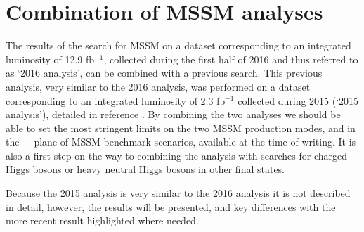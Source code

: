\chapter{Combination of MSSM analyses}
\label{sec:mssm_combination}
The results of the search for MSSM \AHtotautau on a dataset
corresponding to an integrated luminosity of 12.9 fb$^{-1}$, collected during the
first half of 2016 and thus referred to as `2016 analysis', can be combined 
with a previous search. This previous analysis, very similar to the 2016 analysis,
was performed on a dataset corresponding to an integrated luminosity of 2.3 fb$^{-1}$
collected during 2015 (`2015 analysis'), detailed in reference \cite{CMS-PAS-HIG-16-006}.
By combining the two analyses we should be able to set the most stringent
limits on the two MSSM production modes, and in the \mA-\tanb~ plane of 
MSSM benchmark scenarios, available at the time of writing. It is also
a first step on the way to combining the \AHtotautau analysis with
searches for charged Higgs bosons or heavy neutral Higgs bosons in 
other final states. 

Because the 2015 analysis is very similar to the 2016 analysis it 
is not described in detail, however, the results will
be presented, and key differences with the more recent result highlighted
where needed.

